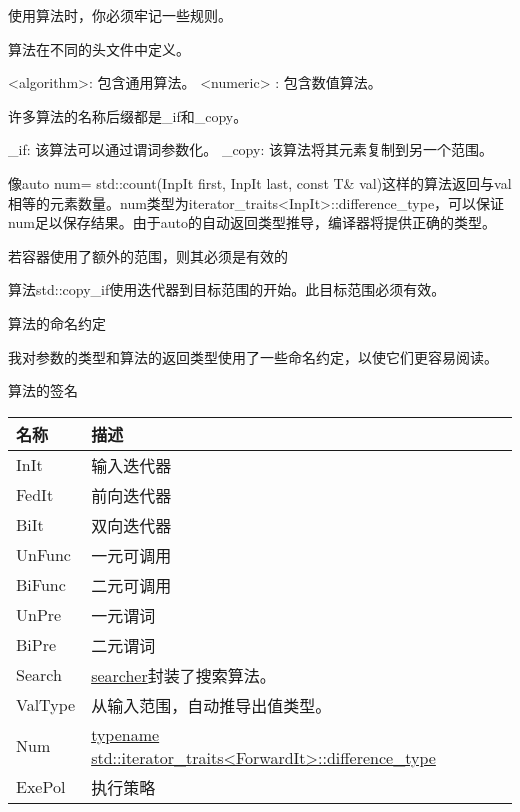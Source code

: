 使用算法时，你必须牢记一些规则。

算法在不同的头文件中定义。

<algorithm>: 包含通用算法。
<numeric> : 包含数值算法。

许多算法的名称后缀都是\_if和\_copy。

\_if: 该算法可以通过谓词参数化。
\_copy: 该算法将其元素复制到另一个范围。

像auto num= std::count(InpIt first, InpIt last, const T\& val)这样的算法返回与val相等的元素数量。num类型为iterator\_traits<InpIt>::difference\_type，可以保证num足以保存结果。由于auto的自动返回类型推导，编译器将提供正确的类型。

\begin{myTip}{若容器使用了额外的范围，则其必须是有效的}

算法std::copy\_if使用迭代器到目标范围的开始。此目标范围必须有效。
\end{myTip}

\begin{myNotic}{算法的命名约定}

我对参数的类型和算法的返回类型使用了一些命名约定，以使它们更容易阅读。

\begin{center}
算法的签名
\end{center}

\begin{longtable}[c]{|l|l|}
\hline
\textbf{名称} & \textbf{描述}   \\ \hline
\endfirsthead
%
\endhead
%
InIt          & 输入迭代器         \\ \hline
FedIt         & 前向迭代器       \\ \hline
BiIt          & 双向迭代器 \\ \hline
UnFunc        & 一元可调用         \\ \hline
BiFunc        & 二元可调用        \\ \hline
UnPre         & 一元谓词        \\ \hline
BiPre         & 二元谓词      \\ \hline
Search  & \href{https://en.cppreference.com/w/cpp/algorithm/search}{searcher}封装了搜索算法。                                    \\ \hline
ValType & 从输入范围，自动推导出值类型。                            \\ \hline
Num     & \href{https://en.cppreference.com/w/cpp/iterator/iterator_traits}{typename std::iterator\_traits\textless{}ForwardIt\textgreater{}::difference\_type} \\ \hline
ExePol        & 执行策略       \\ \hline
\end{longtable}

\end{myNotic}











